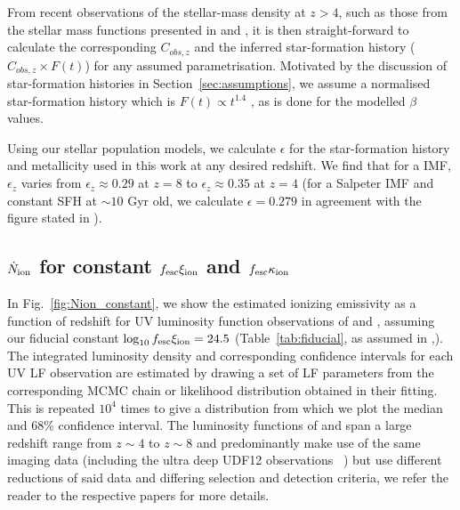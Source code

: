 From recent observations of the stellar-mass density at $z > 4$, such as those from the stellar mass functions presented in \citet{Duncan:2014gh} and \citet{Grazian:2014vx}, it is then straight-forward to calculate the corresponding $C_{obs,z}$ and the inferred star-formation history ($C_{obs,z}\times F(t)$) for any assumed parametrisation. Motivated by the discussion of star-formation histories in Section~\ref{sec:assumptions}, we assume a normalised star-formation history which is $F(t) \propto t^{1.4}$ \citep{Salmon:2014tm}, as is done for the modelled $\beta$ values.

Using our stellar population models, we calculate $\epsilon$ for the star-formation history and metallicity used in this work at any desired redshift. We find that for a \citet{Chabrier:2003ki} IMF, $\epsilon_{z}$ varies from $\epsilon_{z} \approx 0.29$ at $z = 8$ to $\epsilon_{z} \approx 0.35$ at $z = 4$ (for a Salpeter IMF and constant SFH at $\sim 10$ Gyr old, we calculate $\epsilon = 0.279$ in agreement with the figure stated in \citet{Robertson:2013ji}).

\subsection{$\dot{N}_{\rm{ion}}$ for constant $f_{\rm{esc}}\xi_{\rm{ion}}$ and $f_{\rm{esc}}\kappa_{\rm{ion}}$}
In Fig.~\ref{fig:Nion_constant}, we show the estimated ionizing emissivity as a function of redshift for UV luminosity function observations of \citet{Bouwens:2014tx,Finkelstein:2014ub,Oesch:2014cs} and \citet{McLeod:2014wz}, assuming our fiducial constant $\log_{10}f_{\rm{esc}}\xi_{\rm{ion}} = 24.5$ (Table~\ref{tab:fiducial}, as assumed in \citeauthor{Robertson:2013ji},\citeyear{Robertson:2013ji}). The integrated luminosity density and corresponding confidence intervals for each UV LF observation are estimated by drawing a set of LF parameters from the corresponding MCMC chain or likelihood distribution obtained in their fitting. This is repeated $10^{4}$ times to give a distribution from which we plot the median and $68\%$ confidence interval. The luminosity functions of \citet{Bouwens:2014tx} and \citet{Finkelstein:2014ub} span a large redshift range from $z\sim4$ to $z\sim8$ and predominantly make use of the same imaging data (including the ultra deep UDF12 observations \citeauthor{Koekemoer:2013db}~\citeyear{Koekemoer:2013db}) but use different reductions of said data and differing selection and detection criteria, we refer the reader to the respective papers for more details. 

